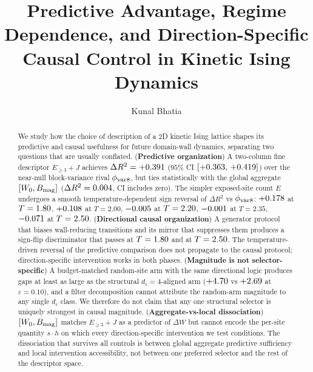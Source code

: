 \documentclass[aps,pre,preprint,superscriptaddress,showpacs]{revtex4-2}
\begin{document}
\title{Predictive Advantage, Regime Dependence, and Direction-Specific
Causal Control in Kinetic Ising Dynamics}

\author{Kunal Bhatia}

\begin{abstract}
We study how the choice of description of a 2D kinetic Ising lattice
shapes its predictive and causal usefulness for future domain-wall
dynamics, separating two questions that are usually conflated.
(\textbf{Predictive organization})\;
A two-column fine descriptor $E_{\geq 3}+J$ achieves
$\Delta R^2 = +0.391$ ($95\%$ CI $[+0.363,\,+0.419]$)
over the near-null block-variance rival $\phi_{\rm var8}$, but ties
statistically with the global aggregate $[W_0, B_{\rm mag}]$
($\Delta R^2 = 0.004$, CI includes zero).
The simpler exposed-site count $E$ undergoes a smooth
temperature-dependent sign reversal of $\Delta R^2$ vs $\phi_{\rm var8}$:
$+0.178$ at $T=1.80$, $+0.108$ at $T=2.00$,
$-0.005$ at $T=2.20$, $-0.001$ at $T=2.35$,
$-0.071$ at $T=2.50$.
(\textbf{Directional causal organization})\;
A generator protocol that biases wall-reducing transitions and its
mirror that suppresses them produces a sign-flip discriminator that
passes \AxisBSignFlips{} at $T=1.80$ and \CausalDisSignFlips{}
at $T=2.50$.
The temperature-driven reversal of the predictive comparison does not
propagate to the causal protocol; direction-specific intervention
works in both phases.
(\textbf{Magnitude is not selector-specific})\;
A budget-matched random-site arm with the same directional logic
produces gaps at least as large as the structural $d_c=4$-aligned arm
($+4.70$ vs $+2.69$ at $\varepsilon=0.10$), and a
filter decomposition cannot attribute the random-arm magnitude to any
single $d_c$ class.
We therefore do not claim that any one structural selector is uniquely
strongest in causal magnitude.
(\textbf{Aggregate-vs-local dissociation})\;
$[W_0, B_{\rm mag}]$ matches $E_{\geq 3}+J$ as a predictor of $\Delta W$
but cannot encode the per-site quantity $s\cdot h$ on which every
direction-specific intervention we test conditions.
The dissociation that survives all controls is between global
aggregate predictive sufficiency and local intervention accessibility,
not between one preferred selector and the rest of the descriptor
space.
\end{abstract}
\end{document}

